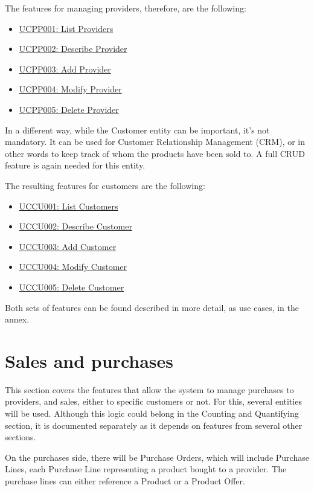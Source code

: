 The features for managing providers, therefore, are the following:
\hfill\break
\begin{itemize}
\item \hyperref[UCPP001]{UCPP001: List Providers}
\item \hyperref[UCPP002]{UCPP002: Describe Provider}
\item \hyperref[UCPP003]{UCPP003: Add Provider}
\item \hyperref[UCPP004]{UCPP004: Modify Provider}
\item \hyperref[UCPP005]{UCPP005: Delete Provider}
\end{itemize}
\hfill\break
In a different way, while the Customer entity can be important, it’s not mandatory. It can be used for Customer Relationship Management (CRM), or in other words to keep track of whom the products have been sold to. A full CRUD feature is again needed for this entity.

The resulting features for customers are the following:
\hfill\break
\begin{itemize}
\item \hyperref[UCCU001]{UCCU001: List Customers}
\item \hyperref[UCCU002]{UCCU002: Describe Customer}
\item \hyperref[UCCU003]{UCCU003: Add Customer}
\item \hyperref[UCCU004]{UCCU004: Modify Customer}
\item \hyperref[UCCU005]{UCCU005: Delete Customer}
\end{itemize}
\hfill\break
Both sets of features can be found described in more detail, as use cases, in the annex.

\section{Sales and purchases}
This section covers the features that allow the system to manage purchases to providers, and sales, either to specific customers or not. For this, several entities will be used. Although this logic could belong in the Counting and Quantifying section, it is documented separately as it depends on features from several other sections. 

On the purchases side, there will be Purchase Orders, which will include Purchase Lines, each Purchase Line representing a product bought to a provider. The purchase lines can either reference a Product or a Product Offer.

